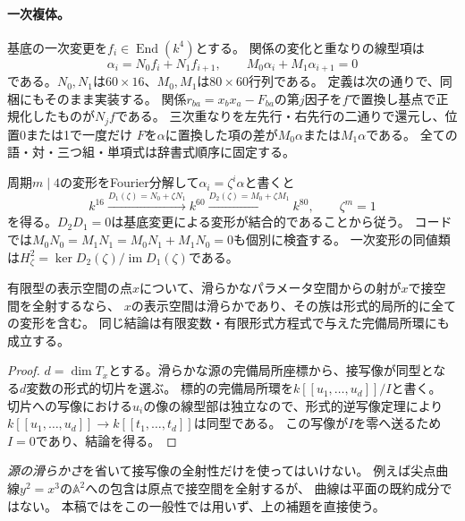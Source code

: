 \paragraph{一次複体。}
基底の一次変更を$f_i\in\operatorname{End}(k^4)$とする。
関係の変化と重なりの線型項は
\begin{equation}\label{eq:linear-complex}
 \alpha_i=N_0f_i+N_1f_{i+1},\qquad
 M_0\alpha_i+M_1\alpha_{i+1}=0
\end{equation}
である。$N_0,N_1$は$60\times16$、$M_0,M_1$は$80\times60$行列である。
定義は次の通りで、同梱にもそのまま実装する。
関係$r_{ba}=x_bx_a-F_{ba}$の第$j$因子を$f$で置換し基点で正規化したものが$N_jf$である。
三次重なりを左先行・右先行の二通りで還元し、位置0または1で一度だけ
$F$を$\alpha$に置換した項の差が$M_0\alpha$または$M_1\alpha$である。
全ての語・対・三つ組・単項式は辞書式順序に固定する。

周期$m\mid4$の変形をFourier分解して$\alpha_i=\zeta^i\alpha$と書くと
\begin{equation}\label{eq:fourier-complex}
 k^{16}\xrightarrow{D_1(\zeta)=N_0+\zeta N_1}
 k^{60}\xrightarrow{D_2(\zeta)=M_0+\zeta M_1}k^{80},\qquad\zeta^m=1
\end{equation}
を得る。$D_2D_1=0$は基底変更による変形が結合的であることから従う。
コードでは$M_0N_0=M_1N_1=M_0N_1+M_1N_0=0$も個別に検査する。
一次変形の同値類は$H^2_\zeta=\ker D_2(\zeta)/\operatorname{im}D_1(\zeta)$である。

\begin{lemma}[滑らかな族を用いる局所完全性]\label{lem:smooth-source}
有限型の表示空間の点$x$について、滑らかなパラメータ空間からの射が$x$で接空間を全射するなら、
$x$の表示空間は滑らかであり、その族は形式的局所的に全ての変形を含む。
同じ結論は有限変数・有限形式方程式で与えた完備局所環にも成立する。
\end{lemma}
\begin{proof}
$d=\dim T_x$とする。滑らかな源の完備局所座標から、接写像が同型となる$d$変数の形式的切片を選ぶ。
標的の完備局所環を$k[[u_1,\ldots,u_d]]/I$と書く。
切片への写像における$u_i$の像の線型部は独立なので、形式的逆写像定理により
$k[[u_1,\ldots,u_d]]\to k[[t_1,\ldots,t_d]]$は同型である。
この写像が$I$を零へ送るため$I=0$であり、結論を得る。
\end{proof}
\begin{remark}
\emph{源の滑らかさ}を省いて接写像の全射性だけを使ってはいけない。
例えば尖点曲線$y^2=x^3$の$\mathbb A^2$への包含は原点で接空間を全射するが、
曲線は平面の既約成分ではない。
本稿では\cite[Proposition 5.1]{BILN}をこの一般性では用いず、上の補題を直接使う。
\end{remark}

